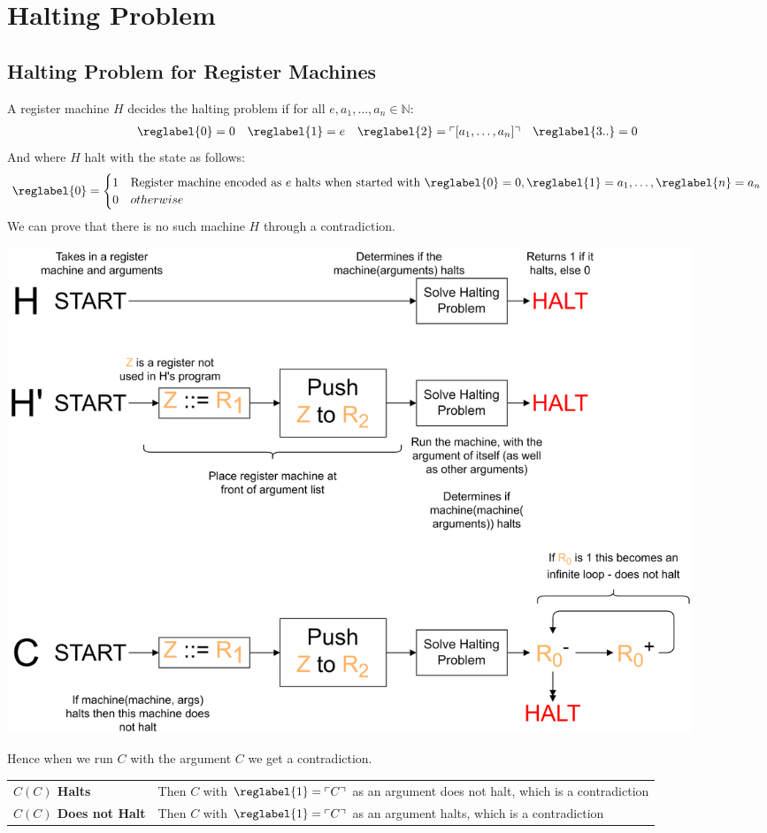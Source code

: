 \chapter{Halting Problem}


\section{Halting Problem for Register Machines}
A register machine $H$ decides the halting problem if for all $e, a_1, \dots, a_n \in \mathbb{N}$:
\[\begin{matrix}
		\reglabel{0} = 0 & \reglabel{1} = e & \reglabel{2} = \ulcorner [a_1, \dots, a_n]\urcorner & \reglabel{3..} = 0 \\
	\end{matrix}\]
And where $H$ halt with the state as follows:
\[\reglabel{0} = \begin{cases}
		1 & \text{Register machine encoded as $e$ halts when started with $\reglabel{0} = 0, \reglabel{1} = a_1, \dots, \reglabel{n} = a_n$} \\
		0 & otherwise                                                                                                                        \\
	\end{cases}\]
We can prove that there is no such machine $H$ through a contradiction.
\begin{center}
    \includegraphics[width=0.9\textwidth]{halting_problem/images/halting_problem.drawio.png}
\end{center}
Hence when we run $C$ with the argument $C$ we get a contradiction.
\begin{center}
    \begin{tabular}{l p{}}
        \textbf{$C(C)$ Halts} & Then $C$ with $\reglabel{1} = \ulcorner C \urcorner$ as an argument does not halt, which is a contradiction \\
        \textbf{$C(C)$ Does not Halt} & Then $C$ with $\reglabel{1} = \ulcorner C \urcorner$ as an argument halts, which is a contradiction \\
    \end{tabular}
\end{center}

